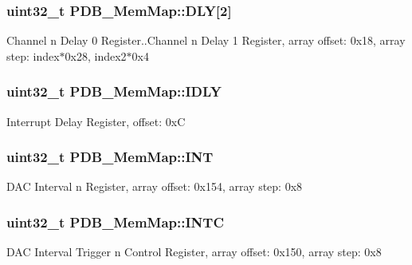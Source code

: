 \subsubsection[{D\+L\+Y}]{\setlength{\rightskip}{0pt plus 5cm}uint32\+\_\+t P\+D\+B\+\_\+\+Mem\+Map\+::\+D\+L\+Y\mbox{[}2\mbox{]}}\label{struct_p_d_b___mem_map_a101a3b427fd438fc5dd9069f9d3f31d6}
Channel n Delay 0 Register..Channel n Delay 1 Register, array offset\+: 0x18, array step\+: index$\ast$0x28, index2$\ast$0x4 \hypertarget{struct_p_d_b___mem_map_abbda47481fef54f3ab340fec07c8b809}{}
\subsubsection[{I\+D\+L\+Y}]{\setlength{\rightskip}{0pt plus 5cm}uint32\+\_\+t P\+D\+B\+\_\+\+Mem\+Map\+::\+I\+D\+L\+Y}\label{struct_p_d_b___mem_map_abbda47481fef54f3ab340fec07c8b809}
Interrupt Delay Register, offset\+: 0x\+C \hypertarget{struct_p_d_b___mem_map_a94d5425758d6d4b2d3141a05603ff7d1}{}
\subsubsection[{I\+N\+T}]{\setlength{\rightskip}{0pt plus 5cm}uint32\+\_\+t P\+D\+B\+\_\+\+Mem\+Map\+::\+I\+N\+T}\label{struct_p_d_b___mem_map_a94d5425758d6d4b2d3141a05603ff7d1}
D\+A\+C Interval n Register, array offset\+: 0x154, array step\+: 0x8 \hypertarget{struct_p_d_b___mem_map_a37fb3d809a70ce9bd67dcc87483064c5}{}
\subsubsection[{I\+N\+T\+C}]{\setlength{\rightskip}{0pt plus 5cm}uint32\+\_\+t P\+D\+B\+\_\+\+Mem\+Map\+::\+I\+N\+T\+C}\label{struct_p_d_b___mem_map_a37fb3d809a70ce9bd67dcc87483064c5}
D\+A\+C Interval Trigger n Control Register, array offset\+: 0x150, array step\+: 0x8 \hypertarget{struct_p_d_b___mem_map_a01bd648b1caa9b6626636fce386b496d}{}

